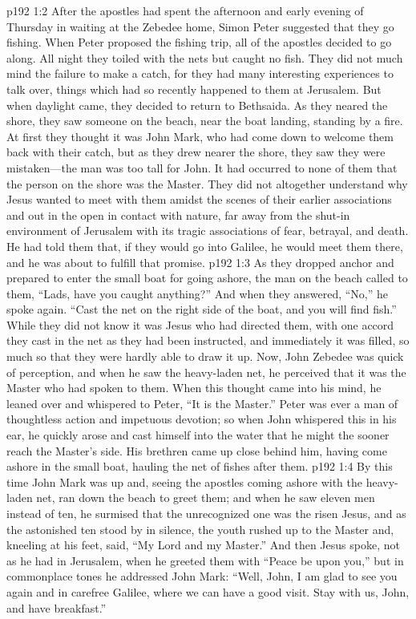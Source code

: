 \vs p192 1:2 After the apostles had spent the afternoon and early evening of Thursday in waiting at the Zebedee home, Simon Peter suggested that they go fishing. When Peter proposed the fishing trip, all of the apostles decided to go along. All night they toiled with the nets but caught no fish. They did not much mind the failure to make a catch, for they had many interesting experiences to talk over, things which had so recently happened to them at Jerusalem. But when daylight came, they decided to return to Bethsaida. As they neared the shore, they saw someone on the beach, near the boat landing, standing by a fire. At first they thought it was John Mark, who had come down to welcome them back with their catch, but as they drew nearer the shore, they saw they were mistaken---the man was too tall for John. It had occurred to none of them that the person on the shore was the Master. They did not altogether understand why Jesus wanted to meet with them amidst the scenes of their earlier associations and out in the open in contact with nature, far away from the shut\hyp{}in environment of Jerusalem with its tragic associations of fear, betrayal, and death. He had told them that, if they would go into Galilee, he would meet them there, and he was about to fulfill that promise.
\vs p192 1:3 As they dropped anchor and prepared to enter the small boat for going ashore, the man on the beach called to them, \textcolor{ubdarkred}{“Lads, have you caught anything?”} And when they answered, “No,” he spoke again. \textcolor{ubdarkred}{“Cast the net on the right side of the boat, and you will find fish.”} While they did not know it was Jesus who had directed them, with one accord they cast in the net as they had been instructed, and immediately it was filled, so much so that they were hardly able to draw it up. Now, John Zebedee was quick of perception, and when he saw the heavy\hyp{}laden net, he perceived that it was the Master who had spoken to them. When this thought came into his mind, he leaned over and whispered to Peter, “It is the Master.” Peter was ever a man of thoughtless action and impetuous devotion; so when John whispered this in his ear, he quickly arose and cast himself into the water that he might the sooner reach the Master’s side. His brethren came up close behind him, having come ashore in the small boat, hauling the net of fishes after them.
\vs p192 1:4 By this time John Mark was up and, seeing the apostles coming ashore with the heavy\hyp{}laden net, ran down the beach to greet them; and when he saw eleven men instead of ten, he surmised that the unrecognized one was the risen Jesus, and as the astonished ten stood by in silence, the youth rushed up to the Master and, kneeling at his feet, said, “My Lord and my Master.” And then Jesus spoke, not as he had in Jerusalem, when he greeted them with \textcolor{ubdarkred}{“Peace be upon you,”} but in commonplace tones he addressed John Mark: \textcolor{ubdarkred}{“Well, John, I am glad to see you again and in carefree Galilee, where we can have a good visit. Stay with us, John, and have breakfast.”}
